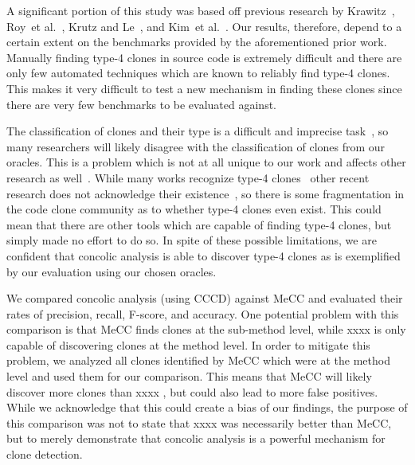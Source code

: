 \documentclass{sig-alternate}
\newif\ifisnopii
\begin{document}
A significant portion of this study was based off previous research by Krawitz~\cite{Kraw2012}, Roy~et al.~\cite{Roy:2009:CEC:1530898.1531101}, Krutz and Le~\cite{Krutz:2014:CCO:2597073.2597127}, and Kim~et al.~\cite{Kim:2011:MMC:1985793.1985835}. Our results, therefore, depend to a certain extent on the benchmarks provided by the aforementioned prior work. Manually finding type-4 clones in source code is extremely difficult and there are only few automated techniques which are known to reliably find type-4 clones. This makes it very difficult to test a new mechanism in finding these clones since there are very few benchmarks to be evaluated against.

The classification of clones and their type is a difficult and imprecise task~\cite{Walenstein:2003:PCT:950792.951349}, so many researchers will likely disagree with the classification of clones from our oracles. This is a problem which is not at all unique to our work and affects other research as well~\cite{Lavoie:2011:ATC:1985404.1985411}. While many works recognize type-4 clones~\cite{Roy:2009:CEC:1530898.1531101,4288192} other recent research does not acknowledge their existence~\cite{Duala-Ekoko:2010:CRD:1767751.1767754,Lavoie:2011:ATC:1985404.1985411}, so there is some fragmentation in the code clone community as to whether type-4 clones even exist. This could mean that there are other tools which are capable of finding type-4 clones, but simply made no effort to do so. In spite of these possible limitations, we are confident that concolic analysis is able to discover type-4 clones as is exemplified by our evaluation using our chosen oracles.

We compared concolic analysis (using CCCD) against MeCC and evaluated their rates of precision, recall, F-score, and accuracy. One potential problem with this comparison is that MeCC finds clones at the sub-method level, while \ifisnopii CCCD \else xxxx \fi is only capable of discovering clones at the method level. In order to mitigate this problem, we analyzed all clones identified by MeCC which were at the method level and used them for our comparison. This means that MeCC will likely discover more clones than \ifisnopii CCCD \else xxxx \fi, but could also lead to more false positives. While we acknowledge that this could create a bias of our findings, the purpose of this comparison was not to state that \ifisnopii CCCD \else xxxx \fi was necessarily better than MeCC, but to merely demonstrate that concolic analysis is a powerful mechanism for clone detection.
\end{document}
